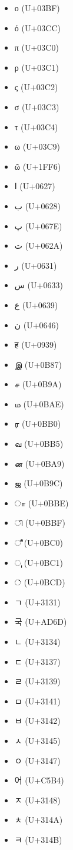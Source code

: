 \documentclass[a4paper]{article}
\begin{document}
\begin{itemize}
    \item ο (U+03BF)
    \item ό (U+03CC)
    \item π (U+03C0)
    \item ρ (U+03C1)
    \item ς (U+03C2)
    \item σ (U+03C3)
    \item τ (U+03C4)
    \item ω (U+03C9)
    \item ῶ (U+1FF6)
    \item ا (U+0627)
    \item ب (U+0628)
    \item پ (U+067E)
    \item ت (U+062A)
    \item ر (U+0631)
    \item س (U+0633)
    \item ع (U+0639)
    \item ن (U+0646)
    \item ह (U+0939)
    \item இ (U+0B87)
    \item ச (U+0B9A)
    \item ம (U+0BAE)
    \item ர (U+0BB0)
    \item வ (U+0BB5)
    \item ன (U+0BA9)
    \item ஜ (U+0B9C)
    \item ா (U+0BBE)
    \item ி (U+0BBF)
    \item ீ (U+0BC0)
    \item ு (U+0BC1)
    \item ் (U+0BCD)
    \item ㄱ (U+3131)
    \item 국 (U+AD6D)
    \item ㄴ (U+3134)
    \item ㄷ (U+3137)
    \item ㄹ (U+3139)
    \item ㅁ (U+3141)
    \item ㅂ (U+3142)
    \item ㅅ (U+3145)
    \item ㅇ (U+3147)
    \item 어 (U+C5B4)
    \item ㅈ (U+3148)
    \item ㅊ (U+314A)
    \item ㅋ (U+314B)

\end{itemize}
\end{document}
